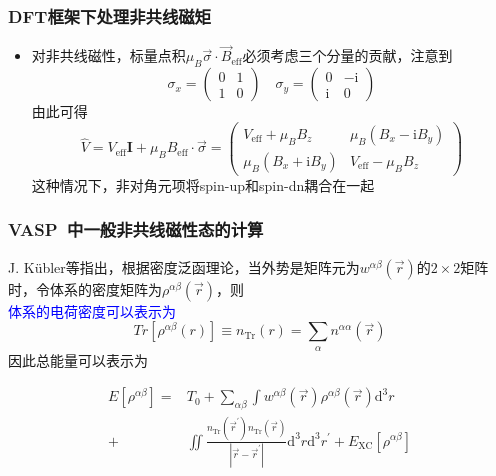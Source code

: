 \frame
{
	\frametitle{\textrm{DFT}框架下处理非共线磁矩}
\begin{itemize}
	\item 对\textrm{非共线磁性}，标量点积$\mu_B\vec\sigma\cdot\vec B_{\mathrm{eff}}$必须考虑三个分量的贡献，注意到
\begin{displaymath}
	\sigma_x=\left(
	\begin{matrix}
		0 &1\\
		1 &0
	\end{matrix}\right)\quad
	\sigma_y=\left(
	\begin{matrix}
		0 &-\mathrm{i}\\
		\mathrm{i} &0
	\end{matrix}\right)
\end{displaymath}
由此可得
		\begin{displaymath}
			\hat V=V_{\mathrm{eff}}\mathbf{I}+\mu_BB_{\mathrm{eff}}\cdot\vec\sigma=\left(
			\begin{matrix}
				V_{\mathrm{eff}}+\mu_BB_z &\mu_B(B_x-\mathrm{i}B_y)\\
				\mu_B(B_x+\mathrm{i}B_y) &V_{\mathrm{eff}}-\mu_BB_z
			\end{matrix}\right)
		\end{displaymath}
		这种情况下，非对角元项将\textrm{spin-up}和\textrm{spin-dn}耦合在一起

\end{itemize}
}

\frame
{
	\frametitle{\textrm{VASP~}中一般非共线磁性态的计算}
	\textrm{J. K\"ubler}等指出，根据密度泛函理论，当外势是矩阵元为$w^{\alpha\beta}(\vec r)$的$2\times2$矩阵时，令体系的密度矩阵为$\rho^{\alpha\beta}(\vec r)$，则\\
	\textcolor{blue}{体系的电荷密度可以表示为}
	\begin{displaymath}
		Tr[\rho^{\alpha\beta}(r)]\equiv n_{\mathrm{Tr}}(r)=\sum_{\alpha}n^{\alpha\alpha}(\vec r)
	\end{displaymath}
	因此总能量可以表示为
	
	\begin{displaymath}
		\begin{aligned}
			E[\rho^{\alpha\beta}]=&T_0+\sum_{\alpha\beta}\int w^{\alpha\beta}(\vec r)\rho^{\alpha\beta}(\vec r)\mathrm{d}^3r\\
			+&\iint\frac{n_{\mathrm{Tr}}(\vec r^{\prime})n_{\mathrm{Tr}}(\vec r)}{|\vec r-\vec r^{\prime}|}\mathrm{d}^3r\mathrm{d}^3r^{\prime}+E_{\mathrm{XC}}[\rho^{\alpha\beta}]
		\end{aligned}
	\end{displaymath}
}

